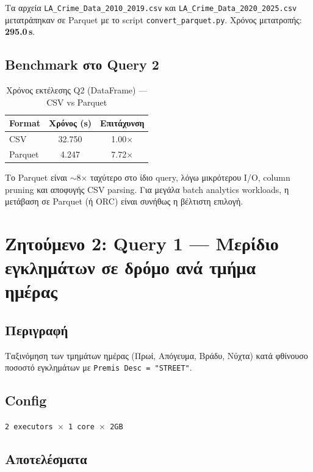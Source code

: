 \documentclass[11pt,a4paper]{article}
\begin{document}
Τα αρχεία \texttt{LA\_Crime\_Data\_2010\_2019.csv} και
\texttt{LA\_Crime\_Data\_2020\_2025.csv} μετατράπηκαν σε Parquet με το script
\texttt{convert\_parquet.py}. Χρόνος μετατροπής: \textbf{295.0\,s}.

\subsection{Benchmark στο Query 2}

\begin{table}[h]
\centering
\caption{Χρόνος εκτέλεσης Q2 (DataFrame) --- CSV vs Parquet}
\begin{tabular}{lcc}
\toprule
Format & Χρόνος (s) & Επιτάχυνση \\
\midrule
CSV    & 32.750 & 1.00$\times$ \\
Parquet & 4.247 & 7.72$\times$ \\
\bottomrule
\end{tabular}
\end{table}

Το Parquet είναι $\sim$8$\times$ ταχύτερο στο ίδιο query, λόγω μικρότερου I/O,
column pruning και αποφυγής CSV parsing. Για μεγάλα batch analytics workloads,
η μετάβαση σε Parquet (ή ORC) είναι συνήθως η βέλτιστη επιλογή.

\section{Ζητούμενο 2: Query 1 --- Μερίδιο εγκλημάτων σε δρόμο ανά τμήμα ημέρας}
\label{sec:q1}

\subsection{Περιγραφή}

Ταξινόμηση των τμημάτων ημέρας (Πρωί, Απόγευμα, Βράδυ, Νύχτα) κατά φθίνουσο
ποσοστό εγκλημάτων με \texttt{Premis Desc = "STREET"}.

\subsection{Config}
\texttt{2 executors $\times$ 1 core $\times$ 2GB}

\subsection{Αποτελέσματα}
\end{document}
